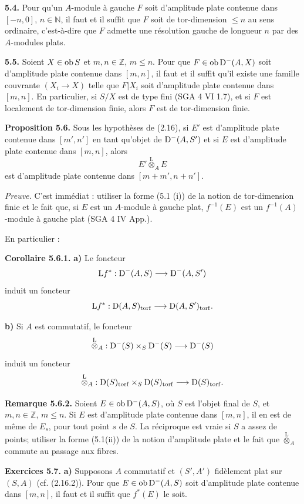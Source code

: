 \documentclass[11pt]{article}
\begin{document}
\textbf{5.4.} Pour qu'un \(A\)-module à gauche \(F\) soit d'amplitude plate contenue dans \([-n,0]\), \(n\in\mathbb N\), il faut et il suffit que \(F\) soit de tor-dimension \(\leq n\) au sens ordinaire, c'est-à-dire que \(F\) admette une résolution gauche de longueur \(n\) par des \(A\)-modules plats.

\textbf{5.5.} Soient \(X\in\operatorname{ob} S\) et \(m,n\in\mathbb Z\), \(m\leq n\). Pour que \(F\in\operatorname{ob}\mathrm D^-(A,X)\) soit d'amplitude plate contenue dans \([m,n]\), il faut et il suffit qu'il existe une famille couvrante \((X_i\to X)\) telle que \(F|X_i\) soit d'amplitude plate contenue dans \([m,n]\). En particulier, si \(S/X\) est de type fini (SGA 4 VI 1.7), et si \(F\) est localement de tor-dimension finie, alors \(F\) est de tor-dimension finie.

\textbf{Proposition 5.6.} Sous les hypothèses de (2.16), si \(E'\) est d'amplitude plate contenue dans \([m',n']\) en tant qu'objet de \(\mathrm D^-(A,S')\) et si \(E\) est d'amplitude plate contenue dans \([m,n]\), alors
\[
  E'\overset{\mathrm L}{\otimes}_A E
\]
est d'amplitude plate contenue dans \([m+m',n+n']\).

\emph{Preuve.} C'est immédiat : utiliser la forme (5.1 (i)) de la notion de tor-dimension finie et le fait que, si \(E\) est un \(A\)-module à gauche plat, \(f^{-1}(E)\) est un \(f^{-1}(A)\)-module à gauche plat (SGA 4 IV App.).

En particulier :

\textbf{Corollaire 5.6.1.} \textbf{a)} Le foncteur
\[
  \mathrm L f^*:\mathrm D^-(A,S)\longrightarrow \mathrm D^-(A,S')
\]
induit un foncteur
\[
  \mathrm L f^*:\mathrm D(A,S)_{\operatorname{torf}}\longrightarrow \mathrm D(A,S')_{\operatorname{torf}}.
\]

\textbf{b)} Si \(A\) est commutatif, le foncteur
\[
  \overset{\mathrm L}{\otimes}_A:
  \mathrm D^-(S)\times_S\mathrm D^-(S)
  \longrightarrow \mathrm D^-(S)
\]
induit un foncteur
\[
  \overset{\mathrm L}{\otimes}_A:
  \mathrm D(S)_{\operatorname{torf}}\times_S\mathrm D(S)_{\operatorname{torf}}
  \longrightarrow \mathrm D(S)_{\operatorname{torf}}.
\]

\textbf{Remarque 5.6.2.} Soient \(E\in\operatorname{ob}\mathrm D^-(A,S)\), où \(S\) est l'objet final de \(S\), et \(m,n\in\mathbb Z\), \(m\leq n\). Si \(E\) est d'amplitude plate contenue dans \([m,n]\), il en est de même de \(E_s\), pour tout point \(s\) de \(S\). La réciproque est vraie si \(S\) a assez de points; utiliser la forme (5.1(ii)) de la notion d'amplitude plate et le fait que \(\overset{\mathrm L}{\otimes}_A\) commute au passage aux fibres.

\textbf{Exercices 5.7.} \textbf{a)} Supposons \(A\) commutatif et \((S',A')\) fidèlement plat sur \((S,A)\) (cf. (2.16.2)). Pour que \(E\in\operatorname{ob}\mathrm D^-(A,S)\) soit d'amplitude plate contenue dans \([m,n]\), il faut et il suffit que \(f^*(E)\) le soit.
\end{document}
